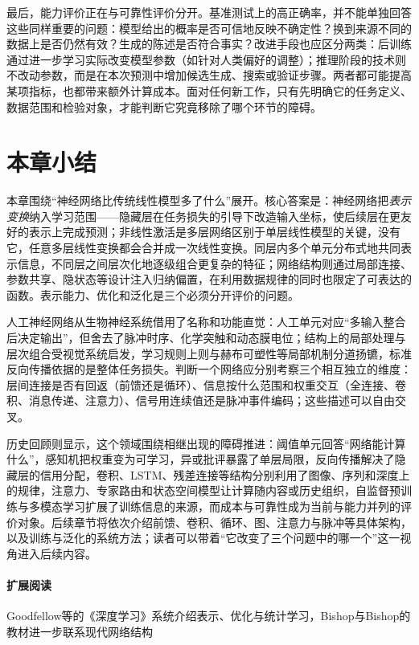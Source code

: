 最后，能力评价正在与可靠性评价分开。基准测试上的高正确率，并不能单独回答这些同样重要的问题：模型给出的概率是否可信地反映不确定性？换到来源不同的数据上是否仍然有效？生成的陈述是否符合事实？改进手段也应区分两类：后训练通过进一步学习实际改变模型参数（如针对人类偏好的调整）；推理阶段的技术则不改动参数，而是在本次预测中增加候选生成、搜索或验证步骤。两者都可能提高某项指标，也都带来额外计算成本。面对任何新工作，只有先明确它的任务定义、数据范围和检验对象，才能判断它究竟移除了哪个环节的障碍。

\FloatBarrier

\section{本章小结}
\label{sec:neural-overview-summary}

本章围绕“神经网络比传统线性模型多了什么”展开。核心答案是：神经网络把\emph{表示变换}纳入学习范围——隐藏层在任务损失的引导下改造输入坐标，使后续层在更友好的表示上完成预测；非线性激活是多层网络区别于单层线性模型的关键，没有它，任意多层线性变换都会合并成一次线性变换。同层内多个单元分布式地共同表示信息，不同层之间层次化地逐级组合更复杂的特征；网络结构则通过局部连接、参数共享、隐状态等设计注入归纳偏置，在利用数据规律的同时也限定了可表达的函数。表示能力、优化和泛化是三个必须分开评价的问题。

人工神经网络从生物神经系统借用了名称和功能直觉：人工单元对应“多输入整合后决定输出”，但舍去了脉冲时序、化学突触和动态膜电位；结构上的局部处理与层次组合受视觉系统启发，学习规则上则与赫布可塑性等局部机制分道扬镳，标准反向传播依据的是整体任务损失。判断一个网络应分别考察三个相互独立的维度：层间连接是否有回返（前馈还是循环）、信息按什么范围和权重交互（全连接、卷积、消息传递、注意力）、信号用连续值还是脉冲事件编码；这些描述可以自由交叉。

历史回顾则显示，这个领域围绕相继出现的障碍推进：阈值单元回答“网络能计算什么”，感知机把权重变为可学习，异或批评暴露了单层局限，反向传播解决了隐藏层的信用分配，卷积、LSTM、残差连接等结构分别利用了图像、序列和深度上的规律，注意力、专家路由和状态空间模型让计算随内容或历史组织，自监督预训练与多模态学习扩展了训练信息的来源，而成本与可靠性成为当前与能力并列的评价对象。后续章节将依次介绍前馈、卷积、循环、图、注意力与脉冲等具体架构，以及训练与泛化的系统方法；读者可以带着“它改变了三个问题中的哪一个”这一视角进入后续内容。

\paragraph{扩展阅读}
Goodfellow等的《深度学习》系统介绍表示、优化与统计学习，Bishop与Bishop的教材进一步联系现代网络结构
